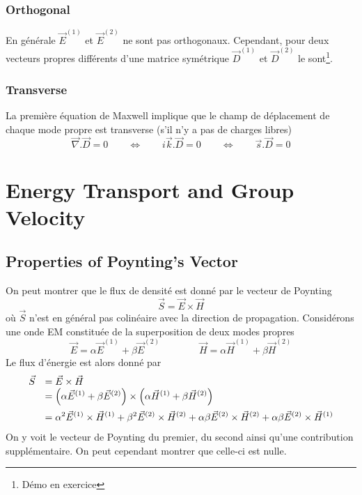 \subsubsection{Orthogonal}
En générale $\vec{E}^{(1)}$ et $\vec{E}^{(2)}$ ne sont pas orthogonaux. Cependant, pour deux vecteurs propres
différents d'une matrice symétrique $\vec{D}^{(1)}$ et $\vec{D}^{(2)}$ le sont\footnote{Démo en exercice}.

\subsubsection{Transverse}
La première équation de Maxwell implique que le champ de déplacement de chaque mode propre est 
transverse (s'il n'y a pas de charges libres)
\begin{equation}
\vec\nabla.\vec{D} = 0\qquad\Leftrightarrow\qquad i\vec{k}.\vec{D} = 0\qquad\Leftrightarrow\qquad
\vec{s}.\vec{D} = 0
\end{equation}




\section{Energy Transport and Group Velocity}
\subsection{Properties of Poynting’s Vector}
On peut montrer que le flux de densité est donné par le vecteur de Poynting
\begin{equation}
\vec{S} = \vec{E}\times\vec{H}
\end{equation}
où $\vec{S}$ n'est en général pas colinéaire avec la direction de propagation. Considérons une onde EM 
constituée de la superposition de deux modes propres
\begin{equation}
\vec{E} = \alpha\vec{E}^{(1)}+\beta\vec{E}^{(2)}\qquad\qquad
\vec{H} = \alpha\vec{H}^{(1)}+\beta\vec{H}^{(2)}
\end{equation}
Le flux d'énergie est alors donné par
\begin{equation}
\begin{array}{ll}
\vec{S} &= \vec{E}\times\vec{H}\\
&=\DS \left(\alpha\vec{E}^{(1)}+\beta\vec{E}^{(2)}\right)\times\left(\alpha\vec{H}^{(1)}+\beta\vec{H}^{(2)}\right)
\vspace{2mm}\\
&=\DS \alpha^2\vec{E}^{(1)}\times\vec{H}^{(1)}+\beta^2\vec{E}^{(2)}\times\vec{H}^{(2)} + 
\alpha\beta\vec{E}^{(2)}\times\vec{H}^{(2)}+\alpha\beta\vec{E}^{(2)}\times\vec{H}^{(1)}
\end{array}
\end{equation}
On y voit le vecteur de Poynting du premier, du second ainsi qu'une contribution supplémentaire. On peut cependant
montrer que celle-ci est nulle.

